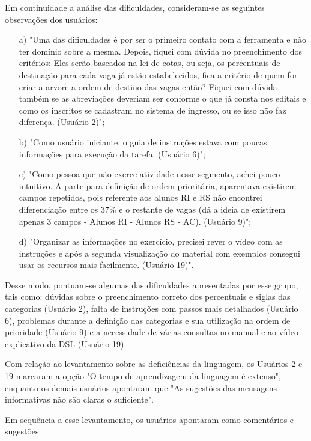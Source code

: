 Em continuidade a análise das dificuldades, consideram-se as seguintes observações dos usuários:

\begin{enumerate}
    \item [a)] "Uma das dificuldades é por ser o primeiro contato com a ferramenta e não ter domínio sobre a mesma. Depois, fiquei com dúvida no preenchimento dos critérios: Eles serão baseados na lei de cotas, ou seja, os percentuais de destinação para cada vaga já estão estabelecidos, fica a critério de quem for criar a arvore a ordem de destino das vagas então? Fiquei com dúvida também se as abreviações deveriam ser conforme o que já consta nos editais e como os inscritos se cadastram no sistema de ingresso, ou se isso não faz diferença. (Usuário 2)"; 
    \item [b)] "Como usuário iniciante, o guia de instruções estava com poucas informações para execução da tarefa. (Usuário 6)";     
    \item [c)] "Como pessoa que não exerce atividade nesse segmento, achei pouco intuitivo. A parte para definição de ordem prioritária, aparentava existirem campos repetidos, pois referente aos alunos RI e RS não encontrei diferenciação entre os 37\% e o restante de vagas (dá a ideia de existirem apenas 3 campos - Alunos RI - Alunos RS - AC). (Usuário 9)";
    \item [d)] "Organizar as informações no exercício, precisei rever o vídeo com as instruções e após a segunda visualização do material com exemplos consegui usar os recursos mais facilmente. (Usuário 19)".     
\end{enumerate}

Desse modo, pontuam-se algumas das dificuldades apresentadas por esse grupo, tais como: dúvidas sobre o preenchimento correto dos percentuais e siglas das categorias (Usuário 2), falta de instruções com passos mais detalhados (Usuário 6), problemas durante a definição das categorias e sua utilização na ordem de prioridade (Usuário 9) e a necessidade de várias consultas no manual e ao vídeo explicativo da DSL (Usuário 19). 

Com relação ao levantamento sobre as deficiências da linguagem, os Usuários 2 e 19 marcaram a opção "O tempo de aprendizagem da linguagem é extenso", enquanto os demais usuários apontaram que "As sugestões das mensagens informativas não são claras o suficiente". 

Em sequência a esse levantamento, os usuários apontaram como comentários e sugestões: 

